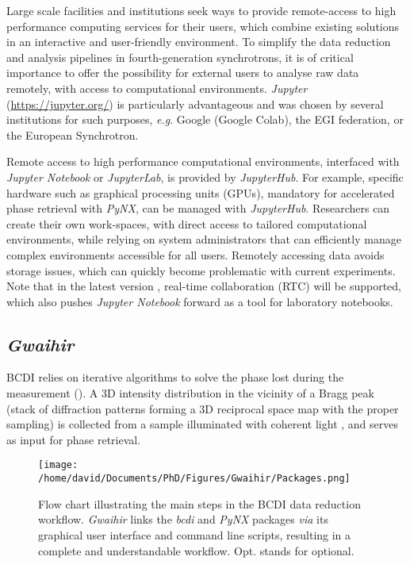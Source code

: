 Large scale facilities and institutions seek ways to provide remote-access to high performance computing services for their users, which combine existing solutions in an interactive and user-friendly environment.
To simplify the data reduction and analysis pipelines in fourth-generation synchrotrons, it is of critical importance to offer the possibility for external users to analyse raw data remotely, with access to computational environments.
\textit{Jupyter} (\url{https://jupyter.org/}) is particularly advantageous and was chosen by several institutions for such purposes, \textit{e.g}. Google (Google Colab), the EGI federation, or the European Synchrotron.

Remote access to high performance computational environments, interfaced with \textit{Jupyter Notebook} or \textit{JupyterLab}, is provided by \textit{JupyterHub}.
For example, specific hardware such as graphical processing units (GPUs), mandatory for accelerated phase retrieval with \textit{PyNX}, can be managed with \textit{JupyterHub}.
Researchers can create their own work-spaces, with direct access to tailored computational environments, while relying on system administrators that can efficiently manage complex environments accessible for all users.
Remotely accessing data avoids storage issues, which can quickly become problematic with current experiments.
Note that in the latest version \parencite{JupyterNotebook7}, real-time collaboration (RTC) will be supported, which also pushes \textit{Jupyter Notebook} forward as a tool for laboratory notebooks.

\subsection{\textit{Gwaihir}} \label{sec:Gwaihir}

BCDI relies on iterative algorithms to solve the phase lost during the measurement (\cite{Robinson2009}).
A 3D intensity distribution in the vicinity of a Bragg peak (stack of diffraction patterns forming a 3D reciprocal space map with the proper sampling) is collected from a sample illuminated with coherent light \parencite{Robinson2005}, and serves as input for phase retrieval.

\begin{figure}[!htb]
    \centering
    \texttt{[image: /home/david/Documents/PhD/Figures/Gwaihir/Packages.png]}
    \caption{
    Flow chart illustrating the main steps in the BCDI data reduction workflow.
    \textit{Gwaihir} links the \textit{bcdi} and \textit{PyNX} packages \textit{via} its graphical user interface and command line scripts, resulting in a complete and understandable workflow.
    Opt. stands for optional.
    }
    \label{fig:Packages}
\end{figure}

